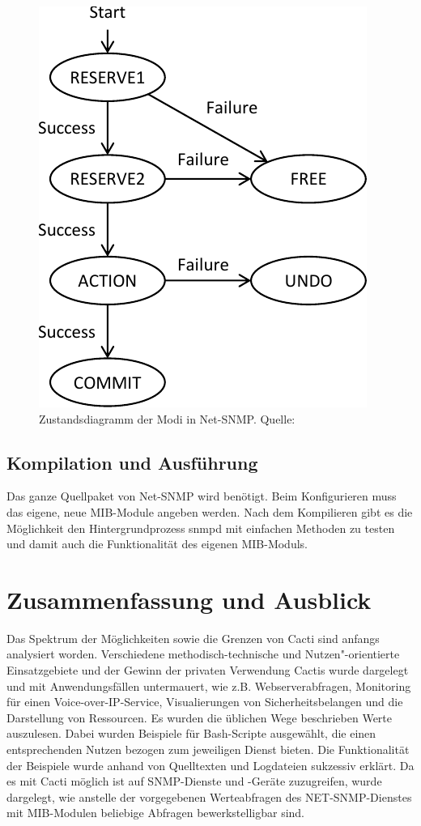 \documentclass[12pt,ngerman,toc=listofnumbered,toc=bibliographynumbered,toc=index,headsepline=true]{scrbook}
\begin{document}
\begin{figure}
	\centering
	\includegraphics[scale=0.75]{bilder/zustandsdiagramm}
	\caption[Zustandsdiagramm der Modi in Net-SNMP]{Zustandsdiagramm der Modi in
	Net-SNMP. Quelle: \cite{NetSNMP11}}
	\label{fig:zustandsdiagramm}
\end{figure}

\section{Kompilation und Ausführung}
Das ganze Quellpaket von Net-SNMP wird benötigt. Beim Konfigurieren muss das
eigene, neue MIB-Module angeben werden. Nach dem Kompilieren gibt es die
Möglichkeit den Hintergrundprozess snmpd mit einfachen Methoden zu testen und
damit auch die Funktionalität des eigenen MIB-Moduls.

\chapter{Zusammenfassung und Ausblick}
Das Spektrum der Möglichkeiten sowie die Grenzen von Cacti sind anfangs
analysiert worden. Verschiedene methodisch-technische und Nutzen"-orientierte
Einsatzgebiete und der Gewinn der privaten Verwendung Cactis wurde dargelegt und
mit Anwendungsfällen untermauert, wie z.B.
Webserverabfragen, Monitoring für einen Voice-over-IP-Service, Visualierungen
von Sicherheitsbelangen und die Darstellung von Ressourcen. Es wurden die
üblichen Wege beschrieben Werte auszulesen. Dabei wurden Beispiele für
Bash-Scripte ausgewählt, die einen entsprechenden Nutzen bezogen zum jeweiligen
Dienst bieten. Die Funktionalität der Beispiele wurde anhand von Quelltexten und
Logdateien sukzessiv erklärt. Da es mit Cacti möglich ist auf SNMP-Dienste und
-Geräte zuzugreifen, wurde dargelegt, wie anstelle der vorgegebenen
Werteabfragen des NET-SNMP-Dienstes mit MIB-Modulen beliebige Abfragen
bewerkstelligbar sind.
\end{document}
